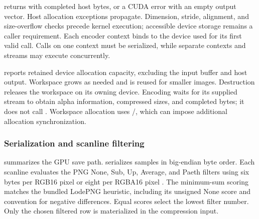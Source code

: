  returns  with completed host bytes,
or a CUDA error with an empty output vector. Host allocation exceptions
propagate. Dimension, stride, alignment, and size-overflow checks precede
kernel execution; accessible device storage remains a caller requirement.
Each encoder context binds to the device used for its first valid call.
Calls on one context must be serialized, while separate contexts and
streams may execute concurrently.

 reports retained device allocation capacity,
excluding the input buffer and host output. Workspace grows as needed
and is reused for smaller images. Destruction releases the
workspace on its owning device. Encoding waits for its supplied stream
to obtain alpha information, compressed sizes, and completed bytes;
it does not call . Workspace allocation
uses /, which can impose additional
allocation synchronization.

\subsubsection{Serialization and scanline filtering}

 summarizes the GPU save path.
 serializes samples in big-endian byte order.
Each scanline evaluates the PNG None, Sub, Up, Average, and Paeth
filters using six bytes per RGB16 pixel or eight per RGBA16 pixel
\cite{PNGThirdEdition2025}. The minimum-sum scoring matches the bundled
LodePNG heuristic, including its unsigned None score and
 convention for negative differences. Equal scores
select the lowest filter number. Only the chosen filtered row is
materialized in the compression input.


